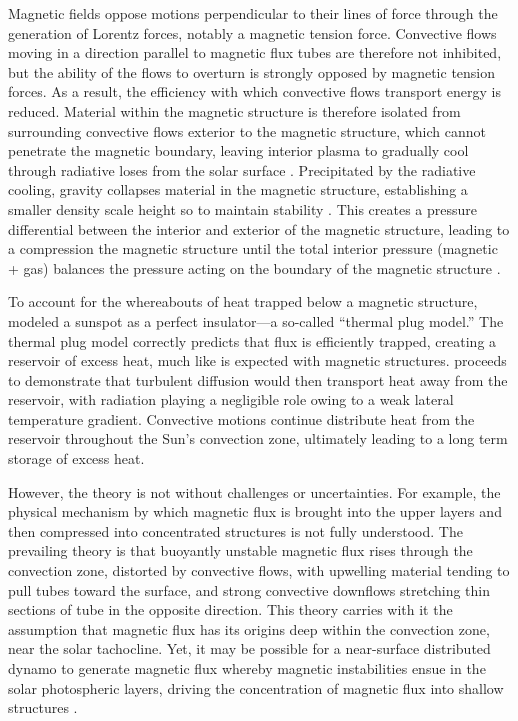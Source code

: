 Magnetic fields oppose motions perpendicular to their lines of force through the generation of Lorentz forces, notably a magnetic tension force. Convective flows moving in a direction parallel to magnetic flux tubes are therefore not inhibited, but the ability of the flows to overturn is strongly opposed by magnetic tension forces. As a result, the efficiency with which convective flows transport energy is reduced. Material within the magnetic structure is therefore isolated from surrounding convective flows exterior to the magnetic structure, which cannot penetrate the magnetic boundary, leaving interior plasma to gradually cool through radiative loses from the solar surface \citep{Stein2012}. Precipitated by the radiative cooling, gravity collapses material in the magnetic structure, establishing a smaller density scale height so to maintain stability \citep{Parker1978}. This creates a pressure differential between the interior and exterior of the magnetic structure, leading to a compression the magnetic structure until the total interior pressure (magnetic + gas) balances the pressure acting on the boundary of the magnetic structure \citep{Parker1978,Spruit1979}.

To account for the whereabouts of heat trapped below a magnetic structure, \citet{Spruit1977} modeled a sunspot as a perfect insulator---a so-called ``thermal plug model.'' The thermal plug model correctly predicts that flux is efficiently trapped, creating a reservoir of excess heat, much like is expected with magnetic structures. \citet{Spruit1977} proceeds to demonstrate that turbulent diffusion would then transport heat away from the reservoir, with radiation playing a negligible role owing to a weak lateral temperature gradient. Convective motions continue distribute heat from the reservoir throughout the Sun's convection zone, ultimately leading to a long term storage of excess heat.

However, the theory is not without challenges or uncertainties. For example, the physical mechanism by which magnetic flux is brought into the upper layers and then compressed into concentrated structures is not fully understood. The prevailing theory is that buoyantly unstable magnetic flux rises through the convection zone, distorted by convective flows, with upwelling material tending to pull tubes toward the surface, and strong convective downflows stretching thin sections of tube in the opposite direction. This theory carries with it the assumption that magnetic flux has its origins deep within the convection zone, near the solar tachocline. Yet, it may be possible for a near-surface distributed dynamo to generate magnetic flux \citep{Brandenburg2005b} whereby magnetic instabilities ensue in the solar photospheric layers, driving the concentration of magnetic flux into shallow structures \citep[the so-called negative effective magnetic pressure instability][]{Brandenburg2011}.

